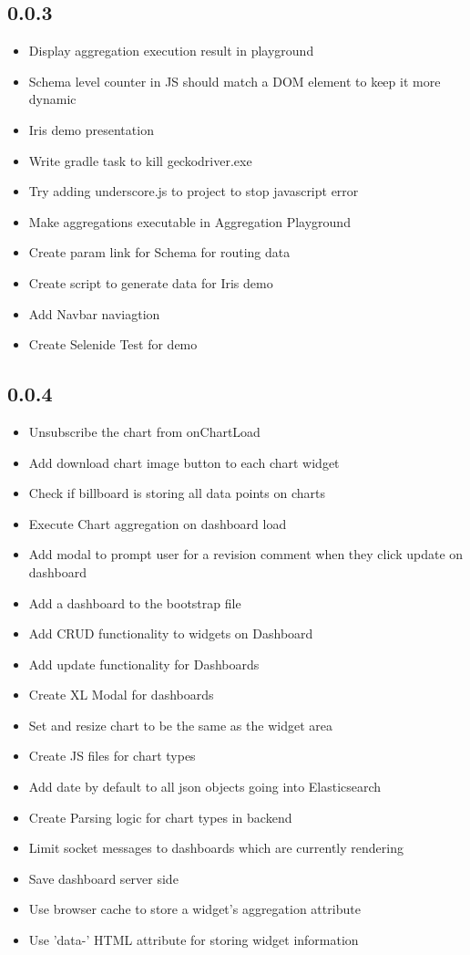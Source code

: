 \documentclass[12pt]{report}
\begin{document}
\subsection{0.0.3}
\begin{itemize}
\item Display aggregation execution result in playground
\item Schema level counter in JS should match a DOM element to keep it more dynamic
\item Iris demo presentation
\item Write gradle task to kill geckodriver.exe
\item Try adding underscore.js to project to stop javascript error
\item Make aggregations executable in Aggregation Playground
\item Create param link for Schema for routing data
\item Create script to generate data for Iris demo
\item Add Navbar naviagtion
\item Create Selenide Test for demo
\end{itemize}
\subsection{0.0.4}
\begin{itemize}
\item Unsubscribe the chart from onChartLoad
\item Add download chart image button to each chart widget
\item Check if billboard is storing all data points on charts
\item Execute Chart aggregation on dashboard load
\item Add modal to prompt user for a revision comment when they click update on dashboard
\item Add a dashboard to the bootstrap file
\item Add CRUD functionality to widgets on Dashboard
\item Add update functionality for Dashboards
\item Create XL Modal for dashboards
\item Set and resize chart to be the same as the widget area
\item Create JS files for chart types
\item Add date by default to all json objects going into Elasticsearch
\item Create Parsing logic for chart types in backend
\item Limit socket messages to dashboards which are currently rendering
\item Save dashboard server side
\item Use browser cache to store a widget's aggregation attribute
\item Use 'data-' HTML attribute for storing widget information
\end{itemize}
\end{document}
